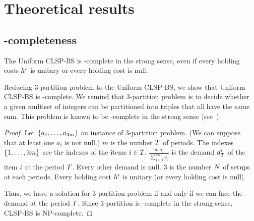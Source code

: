 \section{Theoretical results}
\label{sec:PDP:deterministic:theoretical-results}


\subsection{\NP-completeness}


\begin{thm}
  The Uniform CLSP-BS is \NP-complete in the strong sense, even if every holding costs $h^i$ is unitary or every holding cost is null.
\end{thm}





Reducing 3-partition problem to the Uniform CLSP-BS, we show that Uniform CLSP-BS is \NP-complete. We remind that 3-partition problem is to decide whether a given multiset of integers can be partitioned into triples that all have the same sum. This problem is known to be \NP-complete in the strong sense (see~\cite{Garey1979}).



\begin{proof}
Let $\crbracket{a_1,\ldots,a_{3m}}$ an instance of 3-partition problem. (We can suppose that at least one $a_i$ is not null.)
$m$ is the number $T$ of periods.
The indexes $\crbracket{1,\ldots,3m}$ are the indexes of the items $i\in\mathcal{I}$.
$\frac{m\,a_i}{\sum_{j=1}^{3m}a_j}$ is the demand $d_{T}^i$ of the item $i$ at the period $T$. Every other demand is null.
3 is the number $N$ of setups at each periods.
Every holding cost $h^i$ is unitary (or every holding cost is null).

Thus, we have a solution for 3-partition problem if and only if we can face the demand at the period $T$. Since 3-partition is \NP-complete in the strong sense, CLSP-BS is NP-complete.
\end{proof}


